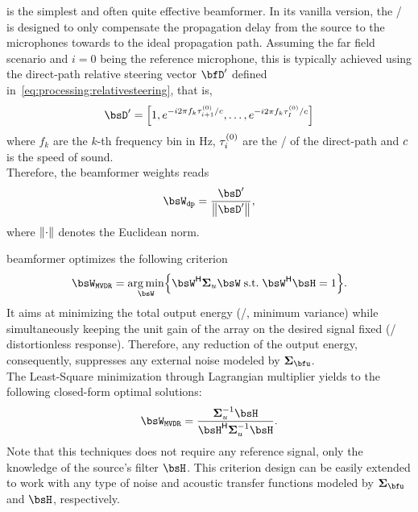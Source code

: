  is the simplest and often quite effective beamformer.
In its vanilla version, the \DS/ is designed to only compensate the propagation delay from the source to the microphones towards to the ideal propagation path.
Assuming the far field scenario and $i=0$ being the reference microphone, this is typically achieved using the direct-path relative steering vector $\bfD'$ defined in~\cref{eq:processing:relativesteering}, that is,
\begin{equation}
    \bsD' = \klist{
                1,
                \cste^{-\csti 2 \pi f_k \tau_{\idxMic+1}^{(0)} / \speedOfSound},
                \ldots,
                \cste^{-\csti 2 \pi f_k \tau_{\numMics}^{(0)} / \speedOfSound}
        }
\end{equation}
where $f_k$ are the $k$-th frequency bin in Hz, $\tau_{i}^{(0)}$ are the \TOAs/ of the direct-path and $c$ is the speed of sound.
\\Therefore, the beamformer weights reads
\begin{equation}
    \bsW_{\mathtt{dp}} = \frac{\bsD'}{\kvvbar{\bsD'}},
\end{equation}
where $\kvvbar{\cdot}$ denotes the Euclidean norm.

 beamformer optimizes the following criterion
\begin{equation}
    \bsW_{\MVDR} = \kargmin_{\bsW} \kbrace{ \khermitian{\bsW} \xpsd_u \bsW\;\text{s.t.}\;\khermitian{\bsW} \FLTS = 1}
    .
\end{equation}
It aims at minimizing the total output energy (\ie/, minimum variance) while simultaneously keeping the unit gain of the array on the desired signal fixed (\ie/ distortionless response).
Therefore, any reduction of the output energy, consequently, suppresses any external noise modeled by $\xpsd_{\bfu}$.
\\The Least-Square minimization through Lagrangian multiplier yields to the following closed-form optimal solutions:
\begin{equation}\label{eq:dechorateapp:mvdr}
    \bsW_{\MVDR} = \frac{\kinv{\xpsd}_{u} \FLTS}
                                {\khermitian{\FLTS} \kinv{\xpsd}_{u} \FLTS}
    .
\end{equation}
Note that this techniques does not require any reference signal, only the knowledge of the source's filter $\FLTS$.
This criterion design can be easily extended to work with any type of noise and acoustic transfer functions modeled by $\xpsd_{\bfu}$ and $\FLTS$, respectively.


